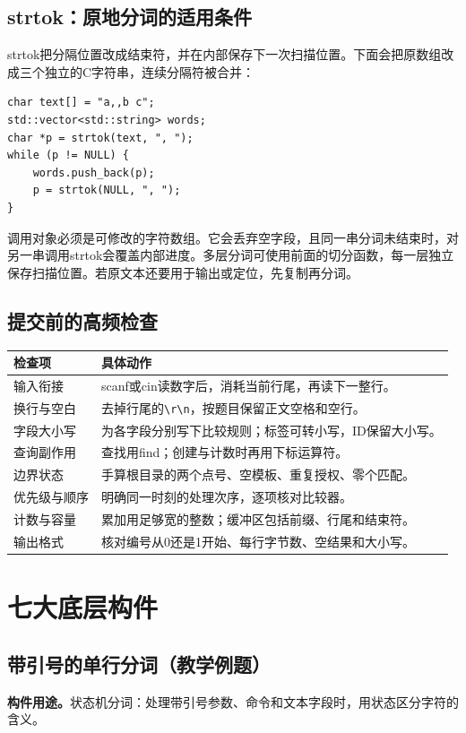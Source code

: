 \documentclass[UTF8,11pt,a4paper,fontset=none]{ctexart}
\begin{document}
\subsection{strtok：原地分词的适用条件}
strtok把分隔位置改成结束符，并在内部保存下一次扫描位置。下面会把原数组改成三个独立的C字符串，连续分隔符被合并：
\par\noindent\begin{minipage}{\linewidth}
\begin{lstlisting}
char text[] = "a,,b c";
std::vector<std::string> words;
char *p = strtok(text, ", ");
while (p != NULL) {
    words.push_back(p);
    p = strtok(NULL, ", ");
}
\end{lstlisting}
\end{minipage}\par
调用对象必须是可修改的字符数组。它会丢弃空字段，且同一串分词未结束时，对另一串调用strtok会覆盖内部进度。多层分词可使用前面的切分函数，每一层独立保存扫描位置。若原文本还要用于输出或定位，先复制再分词。

\subsection{提交前的高频检查}
\begin{longtable}{P{3.5cm}P{10.5cm}}
\toprule 检查项 & 具体动作\\\midrule\endhead
输入衔接 & scanf或cin读数字后，消耗当前行尾，再读下一整行。\\
换行与空白 & 去掉行尾的\texttt{\textbackslash r\textbackslash n}，按题目保留正文空格和空行。\\
字段大小写 & 为各字段分别写下比较规则；标签可转小写，ID保留大小写。\\
查询副作用 & 查找用find；创建与计数时再用下标运算符。\\
边界状态 & 手算根目录的两个点号、空模板、重复授权、零个匹配。\\
优先级与顺序 & 明确同一时刻的处理次序，逐项核对比较器。\\
计数与容量 & 累加用足够宽的整数；缓冲区包括前缀、行尾和结束符。\\
输出格式 & 核对编号从0还是1开始、每行字节数、空结果和大小写。\\
\bottomrule\end{longtable}

\section{七大底层构件}
\subsection{带引号的单行分词（教学例题）}
\noindent\textbf{构件用途。}状态机分词：处理带引号参数、命令和文本字段时，用状态区分字符的含义。
\end{document}
